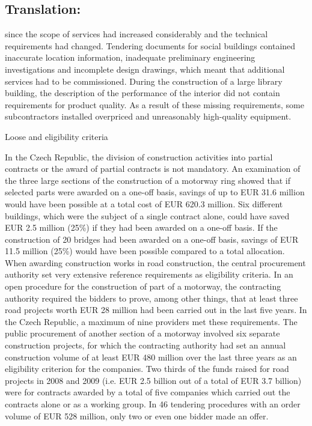 \documentclass[10pt]{article}
\begin{document}
\pagebreak

\subsection*{Translation:}

since the scope of services had increased considerably and the technical requirements had changed.
Tendering documents for social buildings contained inaccurate location information, inadequate preliminary engineering investigations and incomplete design drawings, which meant that additional services had to be commissioned.
During the construction of a large library building, the description of the performance of the interior did not contain requirements for product quality.
As a result of these missing requirements, some subcontractors installed overpriced and unreasonably high-quality equipment.


Loose and eligibility criteria

In the Czech Republic, the division of construction activities into partial contracts or the award of partial contracts is not mandatory.
An examination of the three large sections of the construction of a motorway ring showed that if selected parts were awarded on a one-off basis, savings of up to EUR 31.6 million would have been possible at a total cost of EUR 620.3 million.
Six different buildings, which were the subject of a single contract alone, could have saved EUR 2.5 million (25\%) if they had been awarded on a one-off basis.
If the construction of 20 bridges had been awarded on a one-off basis, savings of EUR 11.5 million (25\%) would have been possible compared to a total allocation.
When awarding construction works in road construction, the central procurement authority set very extensive reference requirements as eligibility criteria.
In an open procedure for the construction of part of a motorway, the contracting authority required the bidders to prove, among other things, that at least three road projects worth EUR 28 million had been carried out in the last five years.
In the Czech Republic, a maximum of nine providers met these requirements.
The public procurement of another section of a motorway involved six separate construction projects, for which the contracting authority had set an annual construction volume of at least EUR 480 million over the last three years as an eligibility criterion for the companies.
Two thirds of the funds raised for road projects in 2008 and 2009 (i.e. EUR 2.5 billion out of a total of EUR 3.7 billion) were for contracts awarded by a total of five companies which carried out the contracts alone or as a working group.
In 46 tendering procedures with an order volume of EUR 528 million, only two or even one bidder made an offer.
\end{document}
